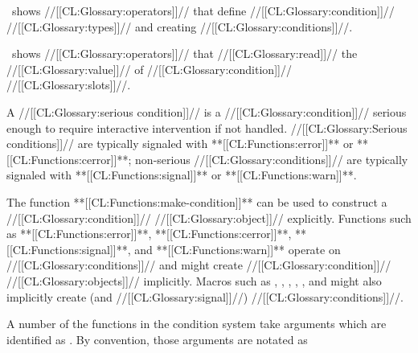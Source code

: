 \Thenextfigure\ shows //[[CL:Glossary:operators]]// that define //[[CL:Glossary:condition]]// //[[CL:Glossary:types]]// and creating //[[CL:Glossary:conditions]]//.


\Thenextfigure\ shows //[[CL:Glossary:operators]]// that //[[CL:Glossary:read]]//  the //[[CL:Glossary:value]]// of //[[CL:Glossary:condition]]// //[[CL:Glossary:slots]]//.

  


A //[[CL:Glossary:serious condition]]// is a //[[CL:Glossary:condition]]// serious enough to require interactive intervention if not handled.   //[[CL:Glossary:Serious conditions]]// are typically signaled with **[[CL:Functions:error]]** or **[[CL:Functions:cerror]]**; non-serious //[[CL:Glossary:conditions]]// are typically signaled with **[[CL:Functions:signal]]** or **[[CL:Functions:warn]]**.

\endsubsubsection%

\endSubsection%


The function **[[CL:Functions:make-condition]]** can be used to construct a //[[CL:Glossary:condition]]// //[[CL:Glossary:object]]// explicitly.  Functions such as **[[CL:Functions:error]]**, **[[CL:Functions:cerror]]**, **[[CL:Functions:signal]]**, and **[[CL:Functions:warn]]** operate on //[[CL:Glossary:conditions]]// and might create //[[CL:Glossary:condition]]// //[[CL:Glossary:objects]]// implicitly.  Macros such as , , , , , and  might also implicitly create (and //[[CL:Glossary:signal]]//) //[[CL:Glossary:conditions]]//.
   

A number of the functions in the condition system take arguments which are identified as . By convention, those arguments are notated as

